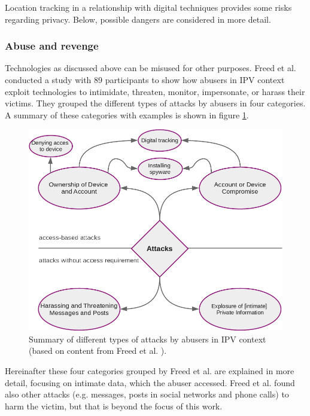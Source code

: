 
Location tracking in a relationship with digital techniques provides some risks regarding privacy. Below, possible dangers are considered in more detail.

\subsubsection{Abuse and revenge}
Technologies as discussed above can be misused for other purposes. Freed et al. \cite{freed2018stalker} conducted a study with 89 participants to show how abusers in \ac{IPV} context exploit technologies to intimidate, threaten, monitor, impersonate, or harass their victims.
They grouped the different types of attacks by abusers in four categories. A summary of these categories with examples is shown in figure \ref{fig:abusing_categories}.

\begin{figure}[htb]
	\centering
	\includegraphics[width=\linewidth]{img/abusing_categories.png}
	\caption{Summary of different types of attacks by abusers in \acl{IPV} context (based on content from Freed et al. \cite{freed2018stalker}).}
	\label{fig:abusing_categories}
\end{figure}
Hereinafter these four categories grouped by Freed et al. \cite{freed2018stalker} are explained in more detail, focusing on intimate data, which the abuser accessed. Freed et al. found also other attacks (e.g. messages, posts in social networks and phone calls) to harm the victim, but that is beyond the focus of this work.


